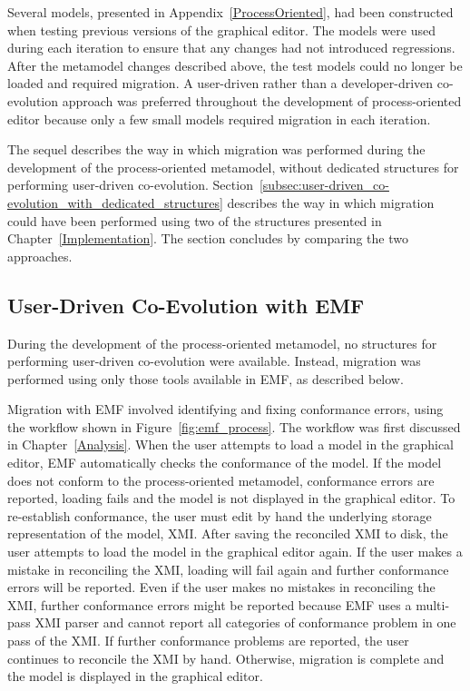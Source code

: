 Several models, presented in Appendix~\ref{ProcessOriented}, had been constructed when testing previous versions of the graphical editor. The models were used during each iteration to ensure that any changes had not introduced regressions. After the metamodel changes described above, the test models could no longer be loaded and required migration. A user-driven rather than a developer-driven co-evolution approach was preferred throughout the development of process-oriented editor because only a few small models required migration in each iteration.

The sequel describes the way in which migration was performed during the development of the process-oriented metamodel, without dedicated structures for performing user-driven co-evolution. Section~\ref{subsec:user-driven_co-evolution_with_dedicated_structures} describes the way in which migration could have been performed using two of the structures presented in Chapter~\ref{Implementation}. The section concludes by comparing the two approaches.

\subsection{User-Driven Co-Evolution with EMF}
\label{subsec:user-driven_co-evolution_with_emf}
During the development of the process-oriented metamodel, no structures for performing user-driven co-evolution were available. Instead, migration was performed using only those tools available in EMF, as described below.

Migration with EMF involved identifying and fixing conformance errors, using the workflow shown in Figure~\ref{fig:emf_process}. The workflow was first discussed in Chapter~\ref{Analysis}. When the user attempts to load a model in the graphical editor, EMF automatically checks the conformance of the model. If the model does not conform to the process-oriented metamodel, conformance errors are reported, loading fails and the model is not displayed in the graphical editor. To re-establish conformance, the user must edit by hand the underlying storage representation of the model, XMI. After saving the reconciled XMI to disk, the user attempts to load the model in the graphical editor again. If the user makes a mistake in reconciling the XMI, loading will fail again and further conformance errors will be reported. Even if the user makes no mistakes in reconciling the XMI, further conformance errors might be reported because EMF uses a multi-pass XMI parser and cannot report all categories of conformance problem in one pass of the XMI. If further conformance problems are reported, the user continues to reconcile the XMI by hand. Otherwise, migration is complete and the model is displayed in the graphical editor. 


